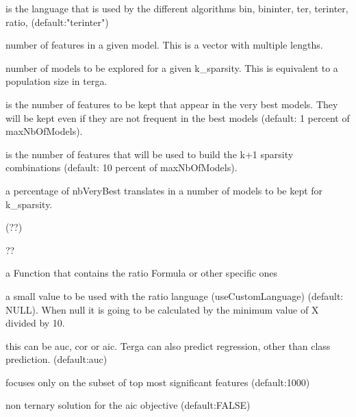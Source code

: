 \documentclass[a4paper]{book}
\begin{document}
%
\begin{Arguments}
\begin{ldescription}
\item[\code{language}] is the language that is used by the different algorithms bin, bininter, ter, terinter, ratio, (default:"terinter")

\item[\code{sparsity:}] number of features in a given model. This is a vector with multiple lengths.

\item[\code{maxNbOfModels:}] number of models to be explored for a given k\_sparsity. This is equivalent to a population size in terga.

\item[\code{nbVeryBest:}] is the number of features to be kept that appear in the very best models. They will be kept even if they are not frequent in the best models (default: 1 percent of maxNbOfModels).

\item[\code{nbBest:}] is the number of features that will be used to build the k+1 sparsity combinations (default: 10 percent of maxNbOfModels).

\item[\code{final.pop.perc:}] a percentage of nbVeryBest translates in a number of models to be kept for k\_sparsity.

\item[\code{popSaveFile:}] (??)

\item[\code{saveFiles:}] ??

\item[\code{scoreFormula:}] a Function that contains the ratio Formula or other specific ones

\item[\code{epsilon:}] a small value to be used with the ratio language (useCustomLanguage) (default: NULL). When null it is going to be calculated by the minimum value of X divided by 10.

\item[\code{objective:}] this can be auc, cor or aic. Terga can also predict regression, other than class prediction. (default:auc)

\item[\code{max.nb.features:}] focuses only on the subset of top most significant features (default:1000)

\item[\code{estimate\_coefs:}] non ternary solution for the aic objective (default:FALSE)


\end{ldescription}
\end{Arguments}
\end{document}
